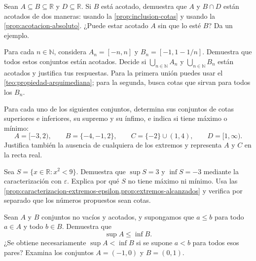 \begin{samepage}
\begin{problem}
Sean $A\subseteq B\subseteq\mathbb{R}$ y $D\subseteq\mathbb{R}$. Si $B$ está acotado, demuestra que $A$ y $B\cap D$ están acotados de dos maneras: usando la \cref{prop:inclusion-cotas} y usando la \cref{prop:acotacion-absoluto}. ¿Puede estar acotado $A$ sin que lo esté $B$? Da un ejemplo.
\end{problem}
\end{samepage}
\par{}

\begin{samepage}
\begin{problem}
Para cada $n\in\mathbb{N}$, considera $A_n=[-n,n]$ y $B_n=[-1,1-1/n]$. Demuestra que todos estos conjuntos están acotados. Decide si $\bigcup_{n\in\mathbb{N}}A_n$ y $\bigcup_{n\in\mathbb{N}}B_n$ están acotados y justifica tus respuestas. Para la primera unión puedes usar el \cref{teo:propiedad-arquimediana}; para la segunda, busca cotas que sirvan para todos los $B_n$.
\end{problem}
\end{samepage}
\par{}

\begin{samepage}
\begin{problem}
Para cada uno de los siguientes conjuntos, determina sus conjuntos de cotas superiores e inferiores, su supremo y su ínfimo, e indica si tiene máximo o mínimo:
\[
 A=[-3,2),\qquad
 B=\{-4,-1,2\},\qquad
 C=\{-2\}\cup(1,4),\qquad
 D=[1,\infty).
\]
Justifica también la ausencia de cualquiera de los extremos y representa $A$ y $C$ en la recta real.
\end{problem}
\end{samepage}
\par{}

\begin{samepage}
\begin{problem}
Sea $S=\{x\in\mathbb{R}:x^2<9\}$. Demuestra que $\sup S=3$ y $\inf S=-3$ mediante la caracterización con $\varepsilon$. Explica por qué $S$ no tiene máximo ni mínimo.
Usa las \cref{prop:caracterizacion-extremos-epsilon,prop:extremos-alcanzados} y verifica por separado que los números propuestos sean cotas.
\end{problem}
\end{samepage}
\par{}

\begin{samepage}
\begin{problem}
Sean $A$ y $B$ conjuntos no vacíos y acotados, y supongamos que $a\leq b$ para todo $a\in A$ y todo $b\in B$. Demuestra que
\[
 \sup A\leq\inf B.
\]
¿Se obtiene necesariamente $\sup A<\inf B$ si se supone $a<b$ para todos esos pares? Examina los conjuntos $A=(-1,0)$ y $B=(0,1)$.
\end{problem}
\end{samepage}
\par{}

